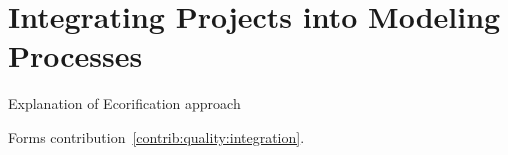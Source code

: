 \chapter{Integrating Projects into Modeling Processes
}

Explanation of Ecorification approach

Forms contribution~\autoref{contrib:quality:integration}.